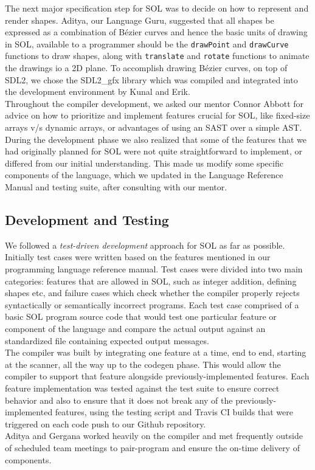 \documentclass[letterpaper,12pt]{report}
\begin{document}
      The next major specification step for SOL was to decide on how to represent and render shapes. Aditya, our Language Guru, suggested that all shapes be expressed as a combination of B\'ezier curves and hence the basic units of drawing in SOL, available to a programmer should be the \texttt{drawPoint} and \texttt{drawCurve} functions to draw shapes, along with \texttt{translate} and \texttt{rotate} functions to animate the drawings io a 2D plane. To accomplish drawing B\'ezier curves, on top of SDL2, we chose the SDL2\_gfx library which was compiled and integrated into the development environment by Kunal and Erik.\\

      Throughout the compiler development, we asked our mentor Connor Abbott for advice on how to prioritize  and implement features crucial for SOL, like fixed-size arrays v/s dynamic arrays, or advantages of using an SAST over a simple AST. During the development phase we also realized that some of the features that we had originally planned for SOL were not quite straightforward to implement, or differed from our initial understanding. This made us modify some specific components of the language, which we updated in the Language Reference Manual and testing suite, after consulting with our mentor.

    \subsection{Development and Testing}
      We followed a \textit{test-driven development} approach for SOL as far as possible. Initially test cases were written based on the features mentioned in our programming language reference manual. Test cases were divided into two main categories: features that are allowed in SOL, such as integer addition, defining shapes etc, and failure cases which check whether the compiler properly rejects syntactically or semantically incorrect programs. Each test case comprised of a basic SOL program source code that would test one particular feature or component of the language and compare the actual output against an standardized file containing expected output messages.\\

      The compiler was built by integrating one feature at a time, end to end, starting at the scanner, all the way up to the codegen phase. This would allow the compiler to support that feature alongside previously-implemented features. Each feature implementation was tested against the test suite to ensure correct behavior and also to ensure that it does not break any of the previously-implemented features, using the testing script and Travis CI builds that were triggered on each code push to our Github repository.\\
      Aditya and Gergana worked heavily on the compiler and met frequently outside of scheduled team meetings to pair-program and ensure the on-time delivery of components.\\
\end{document}
